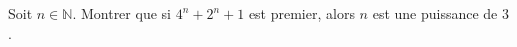 Soit $n \in \mathbb{N}$. Montrer que si $4^n + 2^n + 1$ est premier, alors $n$ est une puissance de $3$.
